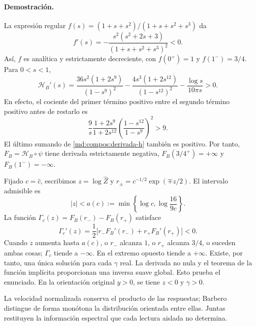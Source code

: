 \paragraph{Demostración.}
La expresión regular
$f(s)=(1+s+s^2)/(1+s+s^2+s^3)$ da
\begin{equation}
 f'(s)=-\frac{s^2(s^2+2s+3)}{(1+s+s^2+s^3)^2}<0.
 \label{md:compos:derivada-f}
\end{equation}
Así, $f$ es analítica y estrictamente decreciente, con $f(0^+)=1$ y
$f(1^-)=3/4$. Para $0<s<1$,
\begin{equation}
 \mathcal H_B'(s)=
 \frac{36s^2(1+2s^9)}{(1-s^9)^2}
 -\frac{4s^3(1+2s^{12})}{(1-s^{12})^2}
 -\frac{\log s}{10\pi s}>0.
 \label{md:compos:derivada-h}
\end{equation}
En efecto, el cociente del primer término positivo entre el segundo término
positivo antes de restarlo es
\begin{equation}
 \frac{9}{s}\frac{1+2s^9}{1+2s^{12}}
 \left(\frac{1-s^{12}}{1-s^9}\right)^2>9.
 \label{md:compos:cota-derivada-h}
\end{equation}
El último sumando de \eqref{md:compos:derivada-h} también es positivo.
Por tanto, $F_B=\mathcal H_B\circ\psi$ tiene derivada estrictamente negativa,
$F_B(3/4^+)=+\infty$ y $F_B(1^-)=-\infty$.

Fijado $c=\widehat c$, escribimos $z=\log\widehat Z$ y
$r_\pm=c^{-1/2}\exp(\mp z/2)$. El intervalo admisible es
\begin{equation}
 |z|<a(c):=\min\left\{\log c,\log\frac{16}{9c}\right\}.
 \label{md:compos:dominio-z}
\end{equation}
La función $\Gamma_c(z)=F_B(r_-)-F_B(r_+)$ satisface
\begin{equation}
 \Gamma_c'(z)=\frac12
 \bigl[r_-F_B'(r_-)+r_+F_B'(r_+)\bigr]<0.
 \label{md:compos:derivada-gamma}
\end{equation}
Cuando $z$ aumenta hasta $a(c)$, o $r_-$ alcanza $1$, o $r_+$ alcanza $3/4$,
o suceden ambas cosas; $\Gamma_c$ tiende a $-\infty$. En el extremo opuesto
tiende a $+\infty$. Existe, por tanto, una única solución para cada $\gamma$
real. La derivada no nula y el teorema de la función implícita proporcionan
una inversa suave global. Esto prueba el enunciado. En la orientación
original $y>0$, se tiene $z<0$ y $\gamma>0$.

La velocidad normalizada conserva el producto de las respuestas; Barbero
distingue de forma monótona la distribución orientada entre ellas. Juntas
restituyen la información espectral que cada lectura aislada no determina.

